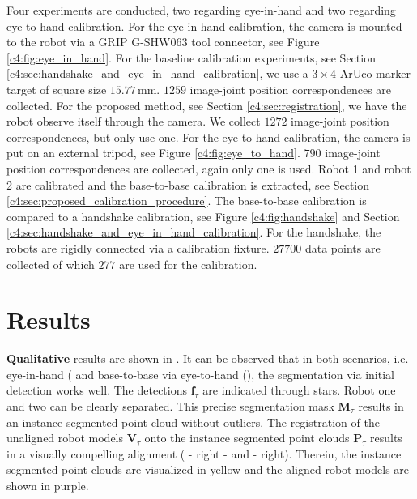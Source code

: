 Four experiments are conducted, two regarding eye-in-hand and two regarding eye-to-hand calibration. For the eye-in-hand calibration, the camera is mounted to the robot via a GRIP G-SHW063 tool connector, see Figure \ref{c4:fig:eye_in_hand}. For the baseline calibration experiments, see Section \ref{c4:sec:handshake_and_eye_in_hand_calibration}, we use a $3\times4$ ArUco marker target of square size $15.77\,\text{mm}$. $1259$ image-joint position correspondences are collected. For the proposed method, see Section \ref{c4:sec:registration}, we have the robot observe itself through the camera. We collect $1272$ image-joint position correspondences, but only use one. For the eye-to-hand calibration, the camera is put on an external tripod, see Figure \ref{c4:fig:eye_to_hand}. $790$ image-joint position correspondences are collected, again only one is used. Robot 1 and robot 2 are calibrated and the base-to-base calibration is extracted, see Section \ref{c4:sec:proposed_calibration_procedure}. The base-to-base calibration is compared to a handshake calibration, see Figure \ref{c4:fig:handshake} and Section \ref{c4:sec:handshake_and_eye_in_hand_calibration}. For the handshake, the robots are rigidly connected via a calibration fixture. $27700$ data points are collected of which $277$ are used for the calibration.

\section{Results}
\label{c4:sec:results}
\textbf{Qualitative} results are shown in . It can be observed that in both scenarios, i.e. eye-in-hand ( and base-to-base via eye-to-hand (), the segmentation via initial detection works well. The detections $\mathbf{f}_\tau$ are indicated through stars. Robot one and two can be clearly separated. This precise segmentation mask $\mathbf{M}_\tau$ results in an instance segmented point cloud without outliers. The registration of the unaligned robot models $\mathbf{V}_\tau$ onto the instance segmented point clouds $\mathbf{P}_\tau$ results in a visually compelling alignment ( - right - and  - right). Therein, the instance segmented point clouds are visualized in yellow and the aligned robot models are shown in purple.

